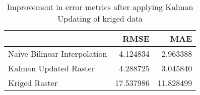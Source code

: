 \begin{table}
\caption{Improvement in error metrics after applying Kalman Updating of kriged data}
\label{tab:oahu4_gebco_raster_error}
\begin{tabular}{lrr}
\toprule
 & RMSE & MAE \\
\midrule
Naive Bilinear Interpolation & 4.124834 & 2.963388 \\
Kalman Updated Raster & 4.288725 & 3.045840 \\
Kriged Raster & 17.537986 & 11.828499 \\
\bottomrule
\end{tabular}
\end{table}
